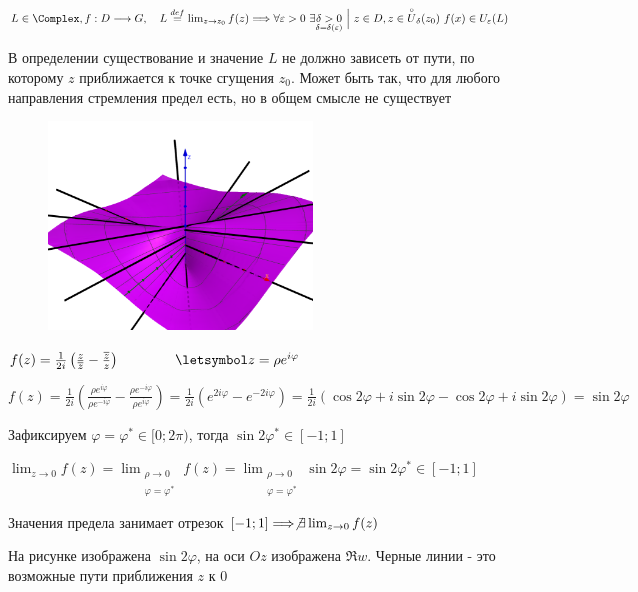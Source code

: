 \Def $L \in \Complex, f : D \longrightarrow G, \quad L \overset{def}{=} \lim_{z \to z_0} f(z) \Longrightarrow
\forall \varepsilon > 0 \ \exists \underset{\delta = \delta(\varepsilon)}{\delta > 0} \ \Big| \ z \in D, z \in \overset{\circ}{U}_\delta(z_0) \ f(x) \in U_\varepsilon(L)$

В определении существование и значение $L$ не должно зависеть от пути, по которому $z$ приближается к точке сгущения $z_0$.
Может быть так, что для любого направления стремления предел есть, но в общем смысле не существует


\begin{figure}
    \includegraphics[width=7cm]{addchapters2/images/addchapters2_2025_02_21_2}
\end{figure}

\Ex $f(z) = \frac{1}{2i} \left(\frac{z}{\overline{z}} - \frac{\overline{z}}{z}\right) \qquad\qquad \letsymbol z = \rho e^{i\varphi}$

$f(z) = \frac{1}{2i} \left(\frac{\rho e^{i\varphi}}{\rho e^{-i\varphi}} - \frac{\rho e^{-i\varphi}}{\rho e^{i\varphi}}\right) =
\frac{1}{2i} \left(e^{2i\varphi} - e^{-2i\varphi}\right) = \frac{1}{2i} (\cos 2\varphi + i\sin 2\varphi - \cos 2\varphi + i\sin 2\varphi) = \sin 2\varphi$

Зафиксируем $\varphi = \varphi^* \in [0; 2\pi)$, тогда $\sin 2\varphi^* \in [-1; 1]$

$\lim_{z \to 0} f(z) = \lim_{\substack{\rho \to 0 \\ \varphi = \varphi^*}} f(z) = 
\lim_{\substack{\rho \to 0 \\ \varphi = \varphi^*}} \sin 2\varphi = \sin 2\varphi^* \in [-1; 1]$

Значения предела занимает отрезок $[-1; 1] \Longrightarrow \not\exists \lim_{z \to 0} f(z)$

На рисунке изображена $\sin 2\varphi$, на оси $Oz$ изображена $\Re w$. Черные линии - это возможные пути приближения $z$ к $0$

